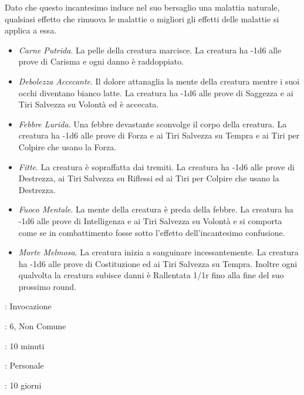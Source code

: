 \begin{multicols}{2}
Dato che questo incantesimo induce nel suo bersaglio una malattia naturale, qualsiasi effetto che rimuova le malattie o migliori gli effetti delle malattie si applica a essa.

\begin{itemize}[leftmargin=*] \setlength{\itemsep}{0pt}
	\item \emph{Carne Putrida}. La pelle della creatura marcisce. La creatura ha -1d6 alle prove di Carisma e ogni danno è raddoppiato.
	\item \emph{Debolezza Accecante}. Il dolore attanaglia la mente della creatura mentre i suoi occhi diventano bianco latte. La creatura ha -1d6 alle prove di Saggezza e ai Tiri Salvezza su Volontà ed è accecata.
	\item \emph{Febbre Lurida}. Una febbre devastante sconvolge il corpo della creatura. La creatura ha -1d6 alle prove di Forza e ai Tiri Salvezza su Tempra e ai Tiri per Colpire che usano la Forza.
	\item \emph{Fitte}. La creatura è sopraffatta dai tremiti. La creatura ha -1d6 alle prove di Destrezza, ai Tiri Salvezza su Riflessi ed ai Tiri per Colpire che usano la Destrezza.
	\item \emph{Fuoco Mentale}. La mente della creatura è preda della febbre. La creatura ha -1d6 alle prove di Intelligenza e ai Tiri Salvezza su Volontà e si comporta come se in combattimento fosse sotto l'effetto dell'incantesimo confusione.
	\item \emph{Morte Melmosa}. La creatura inizia a sanguinare incessantemente. La creatura ha -1d6 alle prove di Costituzione ed ai Tiri Salvezza su Tempra. Inoltre ogni qualvolta la creatura subisce danni è Rallentata 1/1r fino alla fine del suo prossimo round.
\end{itemize}

\noindent\colorbox{OBSSgold!10}{
\begin{minipage}{0.95\linewidth}
\begin{description}[noitemsep, topsep=0pt, parsep=0pt, partopsep=0pt, leftmargin=0cm, labelwidth=1.3cm]
	\item[\textbf{Lista}]: Invocazione
	\item[\textbf{Livello}]: 6, Non Comune
	\item[\textbf{Lancio}]: 10 minuti
	\item[\textbf{Gittata}]: Personale
	\item[\textbf{Durata}]: 10 giorni
\end{description}
\end{minipage}}\smallskip


\end{multicols}
